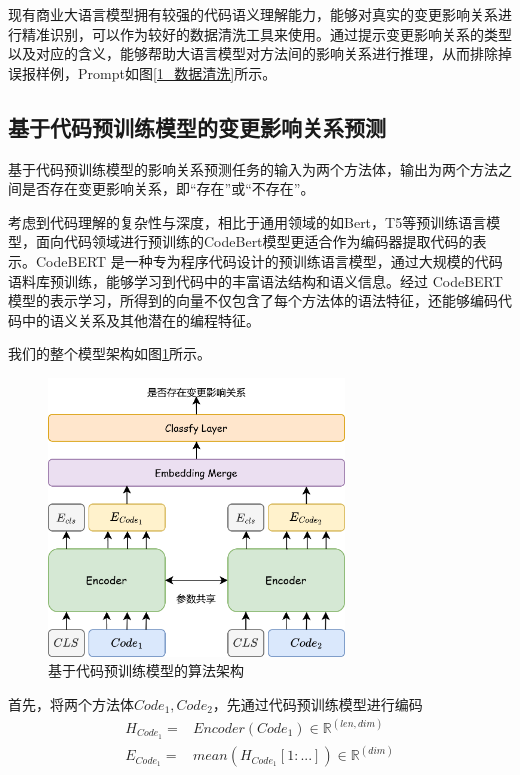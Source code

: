 现有商业大语言模型拥有较强的代码语义理解能力，能够对真实的变更影响关系进行精准识别，可以作为较好的数据清洗工具来使用。通过提示变更影响关系的类型以及对应的含义，能够帮助大语言模型对方法间的影响关系进行推理，从而排除掉误报样例，Prompt如图\ref{1_数据清洗}所示。


\subsection{基于代码预训练模型的变更影响关系预测}

基于代码预训练模型的影响关系预测任务的输入为两个方法体，输出为两个方法之间是否存在变更影响关系，即“存在”或“不存在”。

考虑到代码理解的复杂性与深度，相比于通用领域的如Bert，T5等预训练语言模型，面向代码领域进行预训练的CodeBert模型更适合作为编码器提取代码的表示。CodeBERT 是一种专为程序代码设计的预训练语言模型，通过大规模的代码语料库预训练，能够学习到代码中的丰富语法结构和语义信息。经过 CodeBERT 模型的表示学习，所得到的向量不仅包含了每个方法体的语法特征，还能够编码代码中的语义关系及其他潜在的编程特征。

我们的整个模型架构如图\ref{1_code_bert_overall}所示。
\vspace{0mm}
\begin{figure}[h]
\centering
\includegraphics[width = 0.70\textwidth]{figures/1_code_bert_overall.png}
\caption{基于代码预训练模型的算法架构}
\label{1_code_bert_overall}
\end{figure}


首先，将两个方法体$ Code_1, Code_2$，先通过代码预训练模型进行编码
\begin{align}
H_{Code_1}=&Encoder(Code_1) \in \mathbb{R}^{(len,dim)} \\
E_{Code_1}=&mean(H_{Code_1}[1:...]) \in \mathbb{R}^{(dim)}
\end{align}

